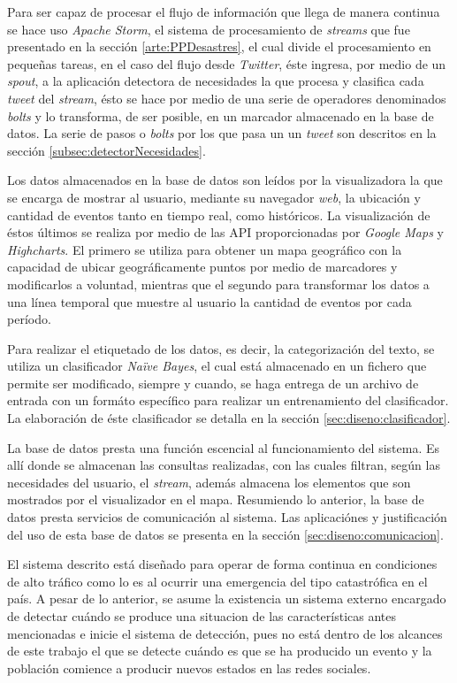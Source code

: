 Para ser capaz de procesar el flujo de información que llega de manera continua se hace uso \textit{Apache Storm}, el sistema de procesamiento de \textit{streams} que fue presentado en la sección \ref{arte:PPDesastres}, el cual divide el procesamiento en pequeñas tareas, en el caso del flujo desde \textit{Twitter}, éste ingresa, por medio de un \textit{spout}, a la aplicación detectora de necesidades la que procesa y clasifica cada \textit{tweet} del \textit{stream}, ésto se hace por medio de una serie de operadores denominados \textit{bolts} y lo transforma, de ser posible, en un marcador almacenado en la base de datos. La serie de pasos o \textit{bolts} por los que pasa un un \textit{tweet} son descritos en la sección \ref{subsec:detectorNecesidades}.

Los datos almacenados en la base de datos son leídos por la visualizadora la que se encarga de mostrar al usuario, mediante su navegador \textit{web}, la ubicación y cantidad de eventos tanto en tiempo real, como históricos. La visualización de éstos últimos se realiza por medio de las API proporcionadas por \textit{Google Maps} y \textit{Highcharts}. El primero se utiliza para obtener un mapa geográfico con la capacidad de ubicar geográficamente puntos por medio de marcadores y modificarlos a voluntad, mientras que el segundo para transformar los datos a una línea temporal que muestre al usuario la cantidad de eventos por cada período.

Para realizar el etiquetado de los datos, es decir, la categorización del texto, se utiliza un clasificador \textit{Naïve Bayes}, el cual está almacenado en un fichero que permite ser modificado, siempre y cuando, se haga entrega de un archivo de entrada con un formáto específico para realizar un entrenamiento del clasificador. La elaboración de éste clasificador se detalla en la sección \ref{sec:diseno:clasificador}.

La base de datos presta una función escencial al funcionamiento del sistema. Es allí donde se almacenan las consultas realizadas, con las cuales filtran, según las necesidades del usuario, el \textit{stream}, además almacena los elementos que son mostrados por el visualizador en el mapa. Resumiendo lo anterior, la base de datos presta servicios de comunicación al sistema. Las aplicaciónes y justificación del uso de esta base de datos se presenta en la sección \ref{sec:diseno:comunicacion}.

El sistema descrito está diseñado para operar de forma continua en condiciones de alto tráfico como lo es al ocurrir una emergencia del tipo catastrófica en el país. A pesar de lo anterior, se asume la existencia un sistema externo encargado de detectar cuándo se produce una situacion de las características antes mencionadas e inicie el sistema de detección, pues no está dentro de los alcances de este trabajo el que se detecte cuándo es que se ha producido un evento y la población comience a producir nuevos estados en las redes sociales.

